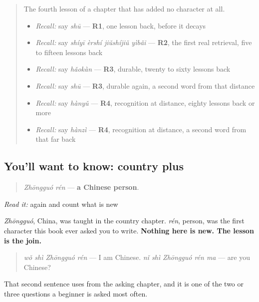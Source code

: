 \begin{quote}
The fourth lesson of a chapter that has added no character at all.

\begin{itemize}
\raggedright
  \item \emph{Recall:} say \emph{shū} — \textbf{R1}, one lesson back, before it decays
  \item \emph{Recall:} say \emph{shíyī èrshí jiǔshíjiǔ yìbǎi} — \textbf{R2}, the first real retrieval, five to fifteen lessons back
  \item \emph{Recall:} say \emph{hǎokàn} — \textbf{R3}, durable, twenty to sixty lessons back
  \item \emph{Recall:} say \emph{shū} — \textbf{R3}, durable again, a second word from that distance
  \item \emph{Recall:} say \emph{hànyǔ} — \textbf{R4}, recognition at distance, eighty lessons back or more
  \item \emph{Recall:} say \emph{hànzì} — \textbf{R4}, recognition at distance, a second word from that far back
\end{itemize}
\end{quote}

\subsection*{You'll want to know: country plus }
\begin{quote}
\textbf{} \emph{Zhōngguó rén} — \textbf{a Chinese person}.
\end{quote}

\emph{Read it:} \textbf{} again and count what is new

 \emph{Zhōngguó}, China, was taught in the country chapter.  \emph{rén}, person, was the first character this book ever asked you to write. \textbf{Nothing here is new. The lesson is the join.}

\begin{quote}
\textbf{} \emph{wǒ shì Zhōngguó rén} — I am Chinese. \textbf{} \emph{nǐ shì Zhōngguó rén ma} — are you Chinese?
\end{quote}

That second sentence uses  from the asking chapter, and it is one of the two or three questions a beginner is asked most often.


